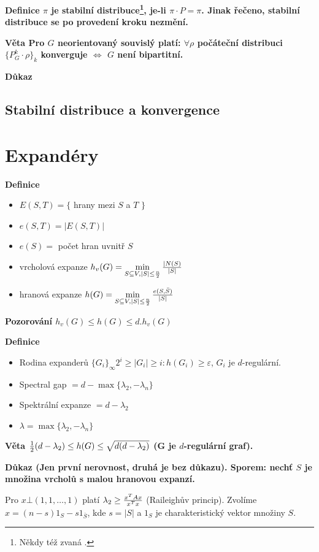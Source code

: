 \documentclass[a4paper,12pt,titlepage]{article}
\newcommand{\dk}{\smallskip\noindent\bf Důkaz\rm{} }
\newcommand{\df}{\smallskip\noindent\bf Definice\rm{} }
\newcommand{\vt}{\smallskip\noindent\bf Věta\rm{} }
\newcommand{\poz}{\smallskip\noindent\bf Pozorování\rm{} }
\begin{document}
\df $\pi$ je stabilní distribuce\footnote{Někdy též zvaná .},
je-li $\pi\cdot P = \pi$. Jinak řečeno, stabilní distribuce se po provedení
kroku nezmění.

\vt Pro $G$ neorientovaný souvislý platí: $\forall \rho$ počáteční distribuci $\{P_G^k\cdot \rho\}_k$ konverguje $\Leftrightarrow$ $G$ není bipartitní.

\dk



\subsection{Stabilní distribuce a konvergence}

\section{Expandéry}

\df
\begin{itemize}
	\item $E(S,T) = \{$ hrany mezi $S$ a $T$ $\}$
	\item $e(S,T) = |E(S,T)|$
	\item $e(S) = $ počet hran uvnitř $S$
	\item vrcholová expanze $h_v(G) = \min\limits_{S\subseteq V, |S|\le {n\over 2}} {|N(S) \over |S|}$
	\item hranová expanze $h(G) = \min\limits_{S\subseteq V, |S|\le {n\over 2}} {e(S,\bar S) \over |S|}$
\end{itemize}

\poz $h_v(G) \le h(G) \le d . h_v(G)$

\df 
\begin{itemize}
	\item Rodina expanderů $\{G_i\}_\infty$\quad$2^i \ge |G_i| \ge i: h(G_i) \ge \varepsilon$, $G_i$ je $d$-regulární.
	\item Spectral gap $= d - \max\{\lambda_2,-\lambda_n\}$
	\item Spektrální expanze $= d - \lambda_2$
	\item $\lambda = \max\{\lambda_2,-\lambda_n\}$
\end{itemize}

\vt ${1\over 2}(d-\lambda_2) \le h(G) \le \sqrt{d(d-\lambda_2)}$ (G je $d$-regulární graf).

\dk (Jen první nerovnost, druhá je bez důkazu). Sporem: nechť $S$ je množina
vrcholů s malou hranovou expanzí.

Pro $x \bot (1,1,\dots,1)$ platí $\lambda_2 \ge {x^TAx\over x^Tx}$ (Raileighův
princip). Zvolíme $x = (n-s)1_S - s1_{\bar S}$, kde $s = |S|$ a $1_S$ je
charakteristický vektor množiny $S$.
\end{document}
